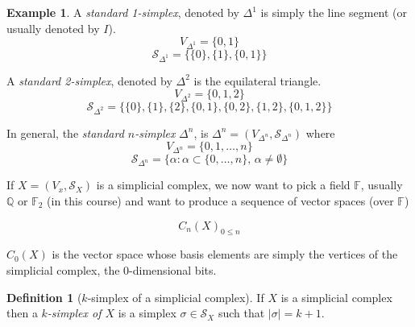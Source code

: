 \documentclass[a4paper,14pt]{extarticle}
\theoremstyle{definition}
\newtheorem*{definition}{Definition}
\newtheorem*{eg}{Example}
\begin{document}
\begin{eg}
	A \emph{standard 1-simplex}, denoted by $\Delta^1$ is simply the line segment (or usually denoted by $I$). 
	\[V_{\Delta^1}=\{0,1\}\] \[\mathcal{S}_{\Delta^1}=\{\{0\},\{1\},\{0,1\}\}\]
	\begin{center}
	\end{center}

\vspace{12pt}

	A \emph{standard 2-simplex}, denoted by $\Delta^2$ is the equilateral triangle.
	\[V_{\Delta^2}=\{0,1,2\}\] \[\mathcal{S}_{\Delta^2}=\{\{0\},\{1\},\{2\},\{0,1\},\{0,2\},\{1,2\},\{0,1,2\}\}\]
	\begin{center}
	\end{center}

	In general, the \emph{standard $n$-simplex} $\Delta^n$, is $\Delta^n=(V_{\Delta^n},\mathcal{S}_{\Delta^n})$ where
	\[V_{\Delta^n}=\{0,1,\ldots,n\}\] \[\mathcal{S}_{\Delta^n}=\{\alpha:\alpha\subset\{0,\ldots,n\}, \,\alpha\neq\emptyset\}\]
\end{eg}

\vspace{12pt}

\noindent If $X=(V_x,\mathcal{S}_X)$ is a simplicial complex, we now want to pick a field $\mathbb{F}$, usually $\mathbb{Q}$ or $\mathbb{F}_2$ (in this course) and want to produce a sequence of vector 
spaces (over $\mathbb{F}$)

\[C_n(X)_{0\leq n}\]

$C_0(X)$ is the vector space whose basis elements are simply the vertices of the simplicial complex, the 0-dimensional bits.

\begin{definition}[$k$-simplex of a simplicial complex]
	If $X$ is a simplicial complex then a \emph{$k$-simplex of $X$} is a simplex $\sigma\in\mathcal{S}_X$ such that $|\sigma|=k+1$.
\end{definition}
\end{document}
